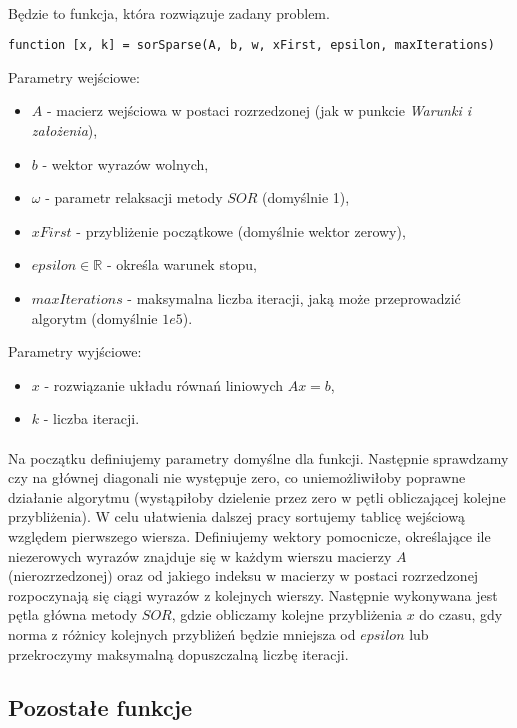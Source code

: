 \documentclass{article}
\begin{document}
\paragraph{}
Będzie to funkcja, która rozwiązuje zadany problem.
\begin{lstlisting}[style=Matlab-editor]
function [x, k] = sorSparse(A, b, w, xFirst, epsilon, maxIterations)
\end{lstlisting}
\vspace{4pt}
Parametry wejściowe:
\begin{itemize}
\item $A$ - macierz wejściowa w postaci rozrzedzonej (jak w punkcie \textit{Warunki i założenia}),
\item $b$ - wektor wyrazów wolnych,
\item $\omega$ - parametr relaksacji metody $SOR$ (domyślnie 1),
\item $xFirst$ - przybliżenie początkowe (domyślnie wektor zerowy),
\item $epsilon\in \mathbb{R}$ - określa warunek stopu,
\item $maxIterations$ - maksymalna liczba iteracji, jaką może przeprowadzić algorytm (domyślnie $1e5$).
\end{itemize}
Parametry wyjściowe:
\begin{itemize}
\item$x$ - rozwiązanie układu równań liniowych $Ax = b$,
\item$ k$ - liczba iteracji.
\end{itemize}
\paragraph{}
Na początku definiujemy parametry domyślne dla funkcji. Następnie sprawdzamy czy na głównej diagonali nie występuje zero, co uniemożliwiłoby poprawne działanie algorytmu (wystąpiłoby dzielenie przez zero w pętli obliczającej kolejne przybliżenia). W celu ułatwienia dalszej pracy sortujemy tablicę wejściową względem pierwszego wiersza. Definiujemy wektory pomocnicze, określające ile niezerowych wyrazów znajduje się w każdym wierszu macierzy $A$ (nierozrzedzonej) oraz od jakiego indeksu w macierzy w postaci rozrzedzonej rozpoczynają się ciągi wyrazów z kolejnych wierszy. Następnie wykonywana jest pętla główna metody $SOR$, gdzie obliczamy kolejne przybliżenia $x$ do czasu, gdy norma z różnicy kolejnych przybliżeń będzie mniejsza od $epsilon$ lub przekroczymy maksymalną dopuszczalną liczbę iteracji.
\subsection{Pozostałe funkcje}
\end{document}

